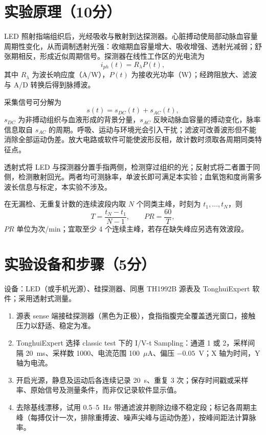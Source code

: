 \documentclass[12pt,a4paper]{ctexart}
\begin{document}
\section*{实验原理（10分）}
LED 照射指端组织后，光经吸收与散射到达探测器。心脏搏动使局部动脉血容量周期性变化，从而调制透射光强：收缩期血容量增大、吸收增强、透射光减弱；舒张期相反，形成近似周期信号。探测器在线性工作区的光电流为
\[
i_{ph}(t)=R_\lambda P(t),
\]
其中 $R_\lambda$ 为波长响应度（A/W），$P(t)$ 为接收光功率（W）；经跨阻放大、滤波与 A/D 转换后得到脉搏波。

采集信号可分解为
\[
s(t)=s_{DC}(t)+s_{AC}(t),
\]
$s_{DC}$ 为非搏动组织与血液形成的背景分量，$s_{AC}$ 反映动脉血容量的搏动变化，脉率信息取自 $s_{AC}$ 的周期。呼吸、运动与环境光会引入干扰；滤波可改善波形但不能消除全部运动伪差。放大电路或软件可能使波形反相，故计数时须取各周期同类特征点。

透射式将 LED 与探测器分置手指两侧，检测穿过组织的光；反射式将二者置于同侧，检测散射回光。两者均可测脉率，单波长即可满足本实验；血氧饱和度尚需多波长信息与标定，本实验不涉及。

在无漏检、无重复计数的连续波段内取 $N$ 个同类主峰，时刻为 $t_1,\ldots,t_N$，则
\[
T=\frac{t_N-t_1}{N-1},\qquad PR=\frac{60}{T},
\]
$PR$ 单位为次/min；宜取至少 4 个连续主峰，若存在缺失峰应另选有效波段。

\section*{实验设备和步骤（5分）}
设备：LED（或手机光源）、硅探测器、同惠 TH1992B 源表及 TonghuiExpert 软件；采用透射式测量。

\begin{enumerate}
\item 源表 sense 端接硅探测器（黑色为正极），食指指腹完全覆盖透光窗口，接触压力以舒适、稳定为准。
\item TonghuiExpert 选择 classic test 下的 I/V-t Sampling：通道 1 或 2，采样间隔 20~ms、采样数 1000、电流范围 100~$\mu$A、偏压 $-0.05$~V；X 轴为时间，Y 轴为电流。
\item 开启光源，静息及运动后各连续记录 20~s、重复 3 次；保存时间戳或采样率、原始信号及测量条件，而非仅记录软件显示值。
\item 去除基线漂移，试用 0.5--5~Hz 带通滤波并剔除边缘不稳定段；标记各周期主峰（每搏仅计一次，排除重搏波、噪声尖峰与运动伪差），按峰间距法计算脉率。
\end{enumerate}


\end{document}
